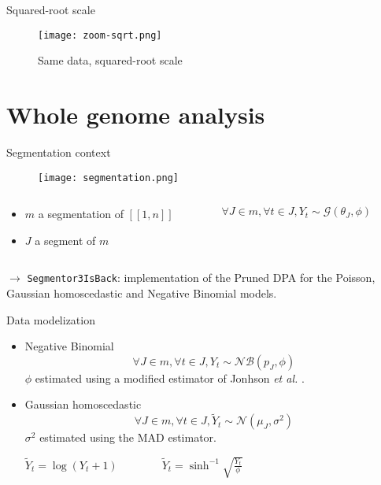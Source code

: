 \documentclass[a4paper]{beamer}
\begin{document}
\begin{frame}{Squared-root scale}
 \begin{figure}
  \texttt{[image: zoom-sqrt.png]}
  \caption{Same data, squared-root scale}
 \end{figure}
\end{frame}

\section{Whole genome analysis}

\begin{frame}{Segmentation context}
	\begin{figure}
	\texttt{[image: segmentation.png]}
	\end{figure}
	\begin{columns}
		\begin{column}{6cm}
			\begin{itemize}
				\item $m$ a segmentation of $[\![1,n]\!]$
				\item $J$ a segment of $m$
			\end{itemize}
		\end{column}
		\begin{column}{6cm}
			$\forall J \in m, \forall t \in J, Y_t \sim \mathcal{G}(\theta_J,\phi) $
		\end{column}
	\end{columns}
	
	\vspace{0.5cm}
	$\rightarrow$ \texttt{Segmentor3IsBack}: implementation of the Pruned DPA for the Poisson, Gaussian homoscedastic and Negative Binomial models.
\end{frame}

\begin{frame}{Data modelization}
	\begin{itemize}
		\item Negative Binomial
			$$\forall J \in m, \forall t \in J, Y_t \sim \mathcal{NB}(p_J,\phi) $$
			$\phi$ estimated using a modified estimator of Jonhson \textit{et al.}  \cite{jonhson_kotz}.
		\item Gaussian homoscedastic
			$$\forall J \in m, \forall t \in J, \tilde{Y}_t \sim \mathcal{N}(\mu_J,\sigma^2) $$
			$\sigma^2$ estimated using the MAD estimator.
			
			$\tilde{Y}_t=\log(Y_t+1) \quad \quad \qquad \tilde{Y}_t=\sinh^{-1}\sqrt{\frac{Y_t}{\phi}}$
	\end{itemize}
\end{frame}
\end{document}
